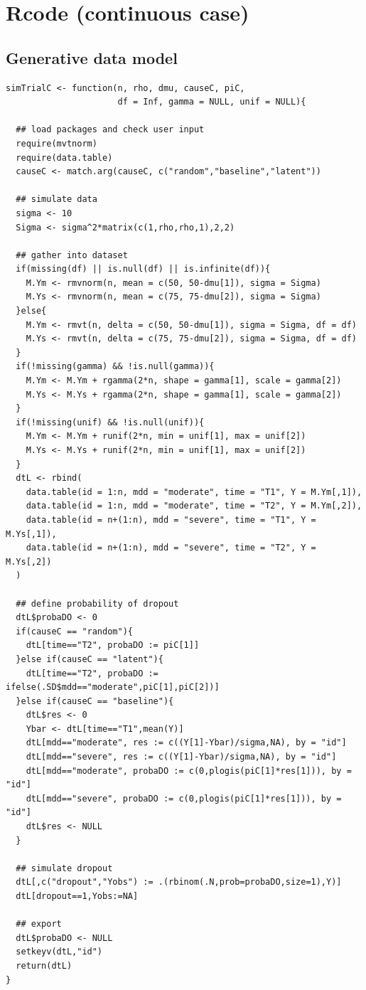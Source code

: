 \documentclass[12pt]{article}
\begin{document}
\renewcommand{\thefigure}{\Alph{figure}}
\renewcommand{\thetable}{\Alph{table}}
\renewcommand{\theequation}{\Alph{equation}}

\setcounter{figure}{0}    
\setcounter{table}{0}    
\setcounter{equation}{0}    

\clearpage

\section{Rcode (continuous case)}
\label{sec:org291628f}
\subsection{Generative data model}
\label{SM:datasim}
\lstset{language=r,label= ,caption= ,captionpos=b,numbers=none}
\begin{lstlisting}
simTrialC <- function(n, rho, dmu, causeC, piC,
                      df = Inf, gamma = NULL, unif = NULL){
  
  ## load packages and check user input
  require(mvtnorm)
  require(data.table)
  causeC <- match.arg(causeC, c("random","baseline","latent"))
  
  ## simulate data
  sigma <- 10
  Sigma <- sigma^2*matrix(c(1,rho,rho,1),2,2)

  ## gather into dataset
  if(missing(df) || is.null(df) || is.infinite(df)){
    M.Ym <- rmvnorm(n, mean = c(50, 50-dmu[1]), sigma = Sigma)
    M.Ys <- rmvnorm(n, mean = c(75, 75-dmu[2]), sigma = Sigma)
  }else{
    M.Ym <- rmvt(n, delta = c(50, 50-dmu[1]), sigma = Sigma, df = df)
    M.Ys <- rmvt(n, delta = c(75, 75-dmu[2]), sigma = Sigma, df = df)
  }
  if(!missing(gamma) && !is.null(gamma)){
    M.Ym <- M.Ym + rgamma(2*n, shape = gamma[1], scale = gamma[2])
    M.Ys <- M.Ys + rgamma(2*n, shape = gamma[1], scale = gamma[2])
  }
  if(!missing(unif) && !is.null(unif)){
    M.Ym <- M.Ym + runif(2*n, min = unif[1], max = unif[2])
    M.Ys <- M.Ys + runif(2*n, min = unif[1], max = unif[2])
  }
  dtL <- rbind(
    data.table(id = 1:n, mdd = "moderate", time = "T1", Y = M.Ym[,1]),
    data.table(id = 1:n, mdd = "moderate", time = "T2", Y = M.Ym[,2]),
    data.table(id = n+(1:n), mdd = "severe", time = "T1", Y = M.Ys[,1]),
    data.table(id = n+(1:n), mdd = "severe", time = "T2", Y = M.Ys[,2])
  )
  
  ## define probability of dropout
  dtL$probaDO <- 0
  if(causeC == "random"){
    dtL[time=="T2", probaDO := piC[1]]
  }else if(causeC == "latent"){
    dtL[time=="T2", probaDO := ifelse(.SD$mdd=="moderate",piC[1],piC[2])]
  }else if(causeC == "baseline"){
    dtL$res <- 0
    Ybar <- dtL[time=="T1",mean(Y)]
    dtL[mdd=="moderate", res := c((Y[1]-Ybar)/sigma,NA), by = "id"]
    dtL[mdd=="severe", res := c((Y[1]-Ybar)/sigma,NA), by = "id"]
    dtL[mdd=="moderate", probaDO := c(0,plogis(piC[1]*res[1])), by = "id"]
    dtL[mdd=="severe", probaDO := c(0,plogis(piC[1]*res[1])), by = "id"]
    dtL$res <- NULL 
  }
  
  ## simulate dropout
  dtL[,c("dropout","Yobs") := .(rbinom(.N,prob=probaDO,size=1),Y)]
  dtL[dropout==1,Yobs:=NA]
  
  ## export
  dtL$probaDO <- NULL
  setkeyv(dtL,"id")
  return(dtL)
}
\end{lstlisting}
\end{document}
